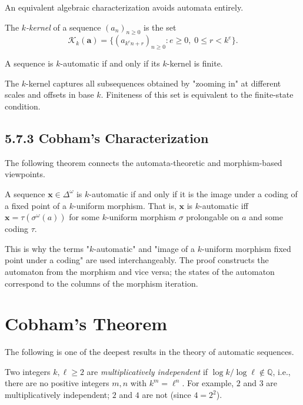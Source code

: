 An equivalent algebraic characterization avoids automata entirely.

\begin{definition}
The \textit{$k$-kernel} of a sequence $(a_n)_{n \geq 0}$ is the set
\[\mathcal{K}_k(\mathbf{a}) = \{ (a_{k^e n + r})_{n \geq 0} : e \geq 0,\; 0 \leq r < k^e\} .\]
\end{definition}

\begin{theorem}[Eilenberg 1974]
A sequence is $k$-automatic if and only if its $k$-kernel is finite.

The $k$-kernel captures all subsequences obtained by "zooming in" at different scales and offsets in base $k$. Finiteness of this set is equivalent to the finite-state condition.
\end{theorem}

\subsection{5.7.3 Cobham's Characterization}

The following theorem connects the automata-theoretic and morphism-based viewpoints.

\begin{theorem}[Cobham 1972]
A sequence $\mathbf{x} \in \Delta^\omega$ is $k$-automatic if and only if it is the image under a coding of a fixed point of a $k$-uniform morphism. That is, $\mathbf{x}$ is $k$-automatic iff $\mathbf{x} = \tau(\sigma^\omega(a))$ for some $k$-uniform morphism $\sigma$ prolongable on $a$ and some coding $\tau$.

This is why the terms "$k$-automatic" and "image of a $k$-uniform morphism fixed point under a coding" are used interchangeably. The proof constructs the automaton from the morphism and vice versa; the states of the automaton correspond to the columns of the morphism iteration.
\end{theorem}



\section{Cobham's Theorem}

The following is one of the deepest results in the theory of automatic sequences.

\begin{definition}
Two integers $k, \ell \geq 2$ are \textit{multiplicatively independent} if $\log k / \log \ell \notin \mathbb{Q}$, i.e., there are no positive integers $m, n$ with $k^m = \ell^n$. For example, $2$ and $3$ are multiplicatively independent; $2$ and $4$ are not (since $4 = 2^2$).
\end{definition}

